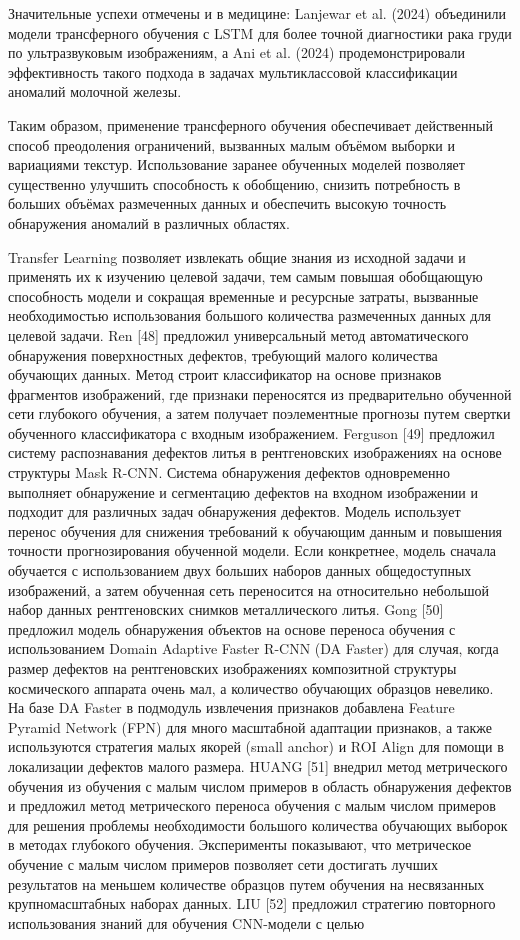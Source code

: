 \documentclass[14pt,a4paper]{article}
\begin{document}
Значительные успехи отмечены и в медицине: Lanjewar et al. (2024) объединили модели трансферного обучения с LSTM для более точной диагностики рака груди по ультразвуковым изображениям, а Ani et al. (2024) продемонстрировали эффективность такого подхода в задачах мультиклассовой классификации аномалий молочной железы.

Таким образом, применение трансферного обучения обеспечивает действенный способ преодоления ограничений, вызванных малым объёмом выборки и вариациями текстур. Использование заранее обученных моделей позволяет существенно улучшить способность к обобщению, снизить потребность в больших объёмах размеченных данных и обеспечить высокую точность обнаружения аномалий в различных областях. \cite{Shukla2025}


Transfer Learning позволяет извлекать общие знания из исходной задачи и применять их к изучению целевой задачи, тем самым повышая обобщающую способность модели и сокращая временные и ресурсные затраты, вызванные необходимостью использования большого количества размеченных данных для целевой задачи. Ren [48] предложил универсальный метод автоматического обнаружения поверхностных дефектов, требующий малого количества обучающих данных. Метод строит классификатор на основе признаков фрагментов изображений, где признаки переносятся из предварительно обученной сети глубокого обучения, а затем получает поэлементные прогнозы путем свертки обученного классификатора с входным изображением. Ferguson [49] предложил систему распознавания дефектов литья в рентгеновских изображениях на основе структуры Mask R-CNN. Система обнаружения дефектов одновременно выполняет обнаружение и сегментацию дефектов на входном изображении и подходит для различных задач обнаружения дефектов. Модель использует перенос обучения для снижения требований к обучающим данным и повышения точности прогнозирования обученной модели. Если конкретнее, модель сначала обучается с использованием двух больших наборов данных общедоступных изображений, а затем обученная сеть переносится на относительно небольшой набор данных рентгеновских снимков металлического литья. Gong [50] предложил модель обнаружения объектов на основе переноса обучения с использованием Domain Adaptive Faster R-CNN (DA Faster) для случая, когда размер дефектов на рентгеновских изображениях композитной структуры космического аппарата очень мал, а количество обучающих образцов невелико. На базе DA Faster в подмодуль извлечения признаков добавлена Feature Pyramid Network (FPN) для много масштабной адаптации признаков, а также используются стратегия малых якорей (small anchor) и ROI Align для помощи в локализации дефектов малого размера. HUANG [51] внедрил метод метрического обучения из обучения с малым числом примеров в область обнаружения дефектов и предложил метод метрического переноса обучения с малым числом примеров для решения проблемы необходимости большого количества обучающих выборок в методах глубокого обучения. Эксперименты показывают, что метрическое обучение с малым числом примеров позволяет сети достигать лучших результатов на меньшем количестве образцов путем обучения на несвязанных крупномасштабных наборах данных. LIU [52] предложил стратегию повторного использования знаний для обучения CNN-модели с целью 
\end{document}
